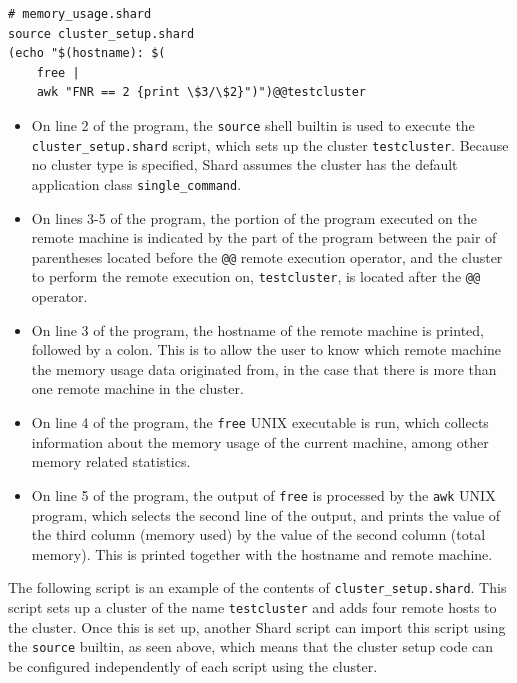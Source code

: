 \documentclass[twoside]{report}
\begin{document}
\begin{minipage}[c]{\textwidth-15pt}
  \begin{lstlisting}[language=Shard]
# memory_usage.shard
source cluster_setup.shard
(echo "$(hostname): $(
    free |
    awk "FNR == 2 {print \$3/\$2}")")@@testcluster
\end{lstlisting}
  \smallskip
\end{minipage}

\begin{itemize}
  \item
        \begin{sloppypar}
          On line 2 of the program, the \texttt{source} shell builtin is used to execute the \texttt{cluster\_setup.shard} script, which sets up the cluster \texttt{testcluster}.
          Because no cluster type is specified, Shard assumes the cluster has the default application class \texttt{single\_command}.
        \end{sloppypar}
  \item On lines 3-5 of the program, the portion of the program executed on the remote machine is indicated by the part of the program between the pair of parentheses located before the \texttt{@@} remote execution operator, and the cluster to perform the remote execution on, \texttt{testcluster}, is located after the \texttt{@@} operator.
  \item On line 3 of the program, the hostname of the remote machine is printed, followed by a colon. This is to allow the user to know which remote machine the memory usage data originated from, in the case that there is more than one remote machine in the cluster.
  \item On line 4 of the program, the \texttt{free} UNIX executable is run, which collects information about the memory usage of the current machine, among other memory related statistics.
  \item On line 5 of the program, the output of \texttt{free} is processed by the \texttt{awk} UNIX program, which selects the second line of the output, and prints the value of the third column (memory used) by the value of the second column (total memory). This is printed together with the hostname and remote machine.
\end{itemize}

The following script is an example of the contents of \texttt{cluster\_setup.shard}.
This script sets up a cluster of the name \texttt{testcluster} and adds four remote hosts to the cluster.
Once this is set up, another Shard script can import this script using the \texttt{source} builtin, as seen above, which means that the cluster setup code can be configured independently of each script using the cluster.
\end{document}
